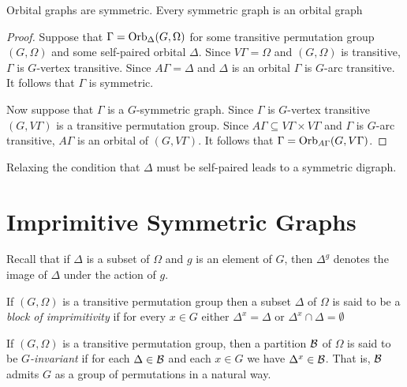 \begin{proposition}
Orbital graphs are symmetric. Every symmetric graph is an orbital graph
\begin{proof}
Suppose that $\Gamma = \operatorname{Orb}_\Delta(G,\Omega)$ 
for some transitive permutation group
$(G,\Omega)$ and some self-paired orbital $\Delta$.
Since $V \Gamma = \Omega$ and $(G,\Omega)$ is transitive,
$\Gamma$ is $G$-vertex transitive.
Since $A \Gamma = \Delta$ and $\Delta$ is an orbital
$\Gamma$ is $G$-arc transitive.
It follows that $\Gamma$ is symmetric.

Now suppose that $\Gamma$ is a $G$-symmetric graph.
Since $\Gamma$ is $G$-vertex transitive
$(G, V \Gamma)$ is a transitive permutation group.
Since $A \Gamma \subseteq V \Gamma \times V \Gamma$
and $\Gamma$ is $G$-arc transitive, $A \Gamma$
is an orbital of $(G,V \Gamma)$.
It follows that $\Gamma = \operatorname{Orb}_{A \Gamma}(G,V \Gamma)$.
\end{proof}
\end{proposition}

Relaxing the condition that $\Delta$ must be self-paired 
leads to a symmetric digraph.

\section{Imprimitive Symmetric Graphs}

Recall that if $\Delta$ is a subset of $\Omega$ 
and $g$ is an element of $G$, then $\Delta^g$ denotes
the image of $\Delta$ under the action of $g$.

\begin{definition}
If $(G,\Omega)$ is a transitive permutation group
then a subset $\Delta$ of $\Omega$
is said to be a \emph{block of imprimitivity} if for every $x \in G$
either $\Delta^x = \Delta$ or $\Delta^x \cap \Delta = \emptyset$
\end{definition}

\begin{definition}
If $(G, \Omega)$ is a transitive permutation group,
then a partition $\mathcal{B}$ of $\Omega$ is said to be \emph{$G$-invariant}
if for each $\Delta \in {\mathcal{B}}$ and each $x \in G$
we have $\Delta^x \in {\mathcal{B}}$. 
That is, $\mathcal{B}$ admits $G$ as a group of permutations in a natural way.
\end{definition}

